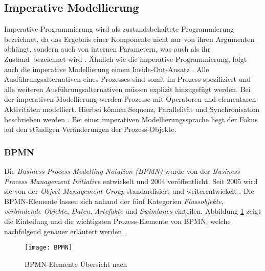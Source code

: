 \subsection{Imperative Modellierung}
Imperative Programmierung wird als zustandsbehaftete Programmierung bezeichnet, da das  Ergebnis einer Komponente nicht nur von ihren Argumenten abhängt, sondern auch von internen Parametern, was auch als ihr \grqq Zustand\grqq \  bezeichnet wird \cite{fahland2009}.  \newline
Ähnlich wie die imperative Programmierung, folgt auch die imperative Modellierung einem \grqq Inside-Out-Ansatz \grqq. Alle Ausführungsalternativen eines Prozesses sind somit im Prozess spezifiziert und alle weiteren Ausführungsalternativen müssen explizit hinzugefügt werden. Bei der imperativen Modellierung werden Prozesse mit Operatoren und elementaren Aktivitäten modelliert. Hierbei können Sequenz, Parallelität und Synchronisation beschrieben werden \cite{kaschek1998}. Bei einer imperativen Modellierungssprache liegt der Fokus auf den ständigen Veränderungen der Prozess-Objekte.

\subsubsection {BPMN}

Die \textit{Business Process Modelling Notation (BPMN)} wurde von der \textit{Business Process Management Initiative} entwickelt und 2004 veröffentlicht. Seit 2005 wird sie von der \textit{Object Management Group} standardisiert und weiterentwickelt \cite{krallmann2013}.
Die BPMN-Elemente lassen sich anhand der fünf Kategorien \textit{Flussobjekte}, \textit{verbindende Objekte}, \textit{Daten}, \textit{Artefakte} und \textit{Swimlanes} einteilen. Abbildung \ref{fig:BPMN} zeigt die Einteilung und die wichtigsten Prozess-Elemente von BPMN, welche nachfolgend genauer erläutert werden \cite{gpfert2012}. \newline

\begin{figure}[htp]
\begin{center}
  \texttt{[image: BPMN]} %
  \caption{BPMN-Elemente Übersicht nach \cite{gpfert2012}}
  \label{fig:BPMN}
\end{center}
\end{figure}


